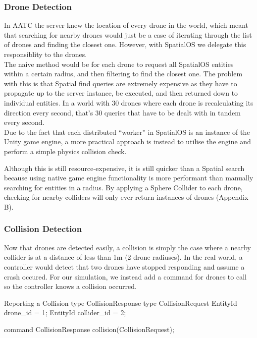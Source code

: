 \documentclass[a4paper,12pt,titlepage]{article}
\begin{document}
\subsubsection{Drone Detection}
In AATC the server knew the location of every drone in the world, which meant that searching for nearby drones would just be a case of iterating through the list of drones and finding the closest one. However, with SpatialOS we delegate this responsiblity to the drones.\\

The naive method would be for each drone to request all SpatialOS entities within a certain radius, and then filtering to find the closest one. The problem with this is that Spatial find queries are extremely expensive as they have to propagate up to the server instance, be executed, and then returned down to individual entities. In a world with 30 drones where each drone is recalculating its direction every second, that's 30 queries that have to be dealt with in tandem every second.\\

Due to the fact that each distributed ``worker'' in SpatialOS is an instance of the Unity game engine, a more practical approach is instead to utilise the engine and perform a simple physics collision check.

Although this is still resource-expensive, it is still quicker than a Spatial search because using native game engine functionality is more performant than manually searching for entities in a radius. By applying a Sphere Collider to each drone, checking for nearby colliders will only ever return instances of drones (Appendix B).

\subsubsection{Collision Detection}
Now that drones are detected easily, a collision is simply the case where a nearby collider is at a distance of less than 1m (2 drone radiuses). In the real world, a controller would detect that two drones have stopped responding and assume a crash occured. For our simulation, we instead add a command for drones to call so the controller knows a collision occurred. \\

\begin{sexylisting}[colback=white]{Reporting a Collision}
type CollisionResponse {}
type CollisionRequest {
  EntityId drone_id = 1;
  EntityId collider_id = 2;
}

command CollisionResponse collision(CollisionRequest);
\end{sexylisting}
\end{document}

